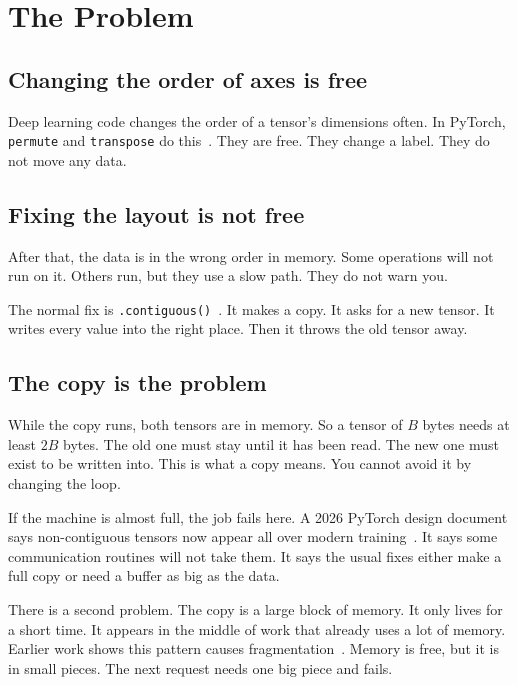 \section{The Problem}
\label{sec:problem}

\subsection{Changing the order of axes is free}

Deep learning code changes the order of a tensor's dimensions often. In
PyTorch, \texttt{permute} and \texttt{transpose} do
this~\cite{pytorch_permute_docs, pytorch_transpose_docs}. They are free. They
change a label. They do not move any data.

\subsection{Fixing the layout is not free}

After that, the data is in the wrong order in memory. Some operations will not
run on it. Others run, but they use a slow path. They do not warn you.

The normal fix is \texttt{.contiguous()}~\cite{pytorch_contiguous_2016}. It
makes a copy. It asks for a new tensor. It writes every value into the right
place. Then it throws the old tensor away.

\subsection{The copy is the problem}

While the copy runs, both tensors are in memory. So a tensor of $B$ bytes needs
at least $2B$ bytes. The old one must stay until it has been read. The new one
must exist to be written into. This is what a copy means. You cannot avoid it
by changing the loop.

If the machine is almost full, the job fails here. A 2026 PyTorch design
document says non-contiguous tensors now appear all over modern
training~\cite{pytorch_rfc_comms_2026}. It says some communication routines
will not take them. It says the usual fixes either make a full copy or need a
buffer as big as the data.

There is a second problem. The copy is a large block of memory. It only lives
for a short time. It appears in the middle of work that already uses a lot of
memory. Earlier work shows this pattern causes
fragmentation~\cite{rajbhandari2020zero}. Memory is free, but it is in small
pieces. The next request needs one big piece and fails.

